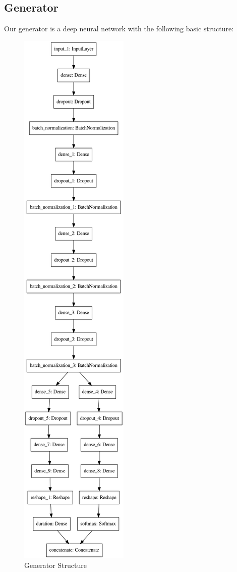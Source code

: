 \documentclass[12pt,oneside]{chicagocapstone}
\begin{document}
\hypertarget{generator}{%
\subsection*{Generator}\label{generator}}

Our generator is a deep neural network with the following basic structure:
\begin{figure}

{\centering \includegraphics[width=0.3\linewidth]{figure/gen_model} 

}

\caption{Generator Structure}\label{fig:unnamed-chunk-5}
\end{figure}
\end{document}
